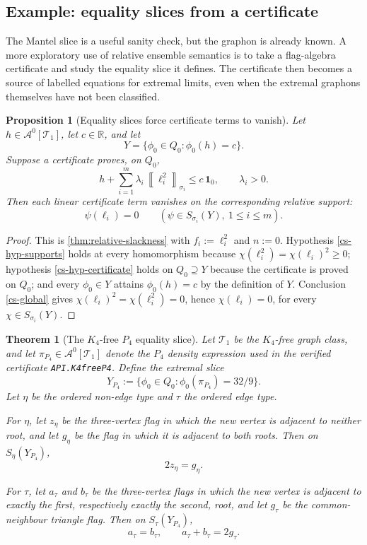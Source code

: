 \documentclass[11pt]{article}
\newtheorem{theorem}{Theorem}
\newtheorem{proposition}[proposition]{Proposition}
\theoremstyle{definition}
\newcommand{\R}{\mathbb{R}}
\newcommand{\A}{\mathcal{A}}
\newcommand{\T}{\mathcal{T}}
\newcommand{\avg}[2]{\left\llbracket #1 \right\rrbracket_{#2}}
\newcommand{\one}{\mathbf 1}
\begin{document}
\subsection{Example: equality slices from a certificate}

The Mantel slice is a useful sanity check, but the graphon is already known.  A more
exploratory use of relative ensemble semantics is to take a flag-algebra certificate and
study the equality slice it defines.  The certificate then becomes a source of labelled
equations for extremal limits, even when the extremal graphons themselves have not been
classified.

\begin{proposition}[Equality slices force certificate terms to vanish]\label{prop:equality-slice-vanishing}
Let $h\in\A^0[\T_1]$, let $c\in\R$, and let
\[
  Y=\{\phi_0\in Q_0:\phi_0(h)=c\}.
\]
Suppose a certificate proves, on $Q_0$,
\[
  h+\sum_{i=1}^m \lambda_i\,\avg{\ell_i^2}{\sigma_i}\le c\,\one_0,
  \qquad
  \lambda_i>0 .
\]
Then each linear certificate term vanishes on the corresponding relative support:
\[
  \psi(\ell_i)=0
  \qquad
  (\psi\in S_{\sigma_i}(Y),\ 1\le i\le m).
\]
\end{proposition}

\begin{proof}
This is \cref{thm:relative-slackness} with $f_i:=\ell_i^2$ and $n:=0$.  Hypothesis
\ref{cs-hyp-supports} holds at every homomorphism because
$\chi(\ell_i^2)=\chi(\ell_i)^2\ge0$; hypothesis \ref{cs-hyp-certificate} holds on
$Q_0\supseteq Y$ because the certificate is proved on $Q_0$; and every $\phi_0\in Y$
attains $\phi_0(h)=c$ by the definition of $Y$.  Conclusion \ref{cs-global} gives
$\chi(\ell_i)^2=\chi(\ell_i^2)=0$, hence $\chi(\ell_i)=0$, for every
$\chi\in S_{\sigma_i}(Y)$.
\end{proof}

\begin{theorem}[The $K_4$-free $P_4$ equality slice]\label{thm:k4free-p4-equality-slice}
Let $\T_1$ be the $K_4$-free graph class, and let $\pi_{P_4}\in\A^0[\T_1]$ denote
the $P_4$ density expression used in the verified certificate
\texttt{API.K4freeP4}.  Define the extremal slice
\[
  Y_{P_4}:=\{\phi_0\in Q_0:\phi_0(\pi_{P_4})=32/9\}.
\]
Let $\eta$ be the ordered non-edge type and $\tau$ the ordered edge type.

For $\eta$, let $z_\eta$ be the three-vertex flag in which the new vertex is adjacent
to neither root, and let $g_\eta$ be the flag in which it is adjacent to both roots.
Then on $S_\eta(Y_{P_4})$,
\[
  2z_\eta=g_\eta .
\]

For $\tau$, let $a_\tau$ and $b_\tau$ be the three-vertex flags in which the new
vertex is adjacent to exactly the first, respectively exactly the second, root, and let
$g_\tau$ be the common-neighbour triangle flag.  Then on $S_\tau(Y_{P_4})$,
\[
  a_\tau=b_\tau,
  \qquad
  a_\tau+b_\tau=2g_\tau .
\]
\end{theorem}
\end{document}
